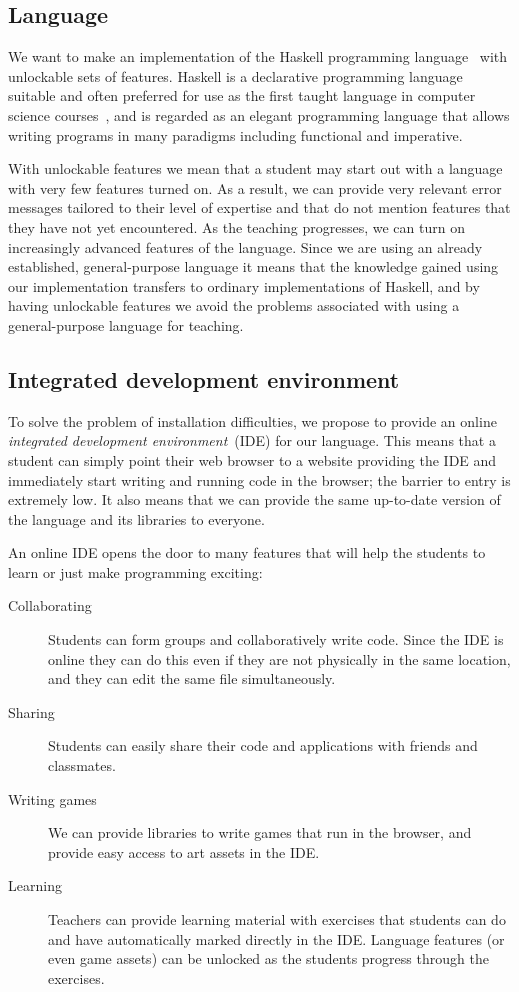 \subsection{Language}

We want to make an implementation of the Haskell programming
language~\cite{marlow2010haskell} with unlockable sets of features.  Haskell is
a declarative programming language suitable and often preferred for use as the
first taught language in computer science courses~\cite{dijkstra2001members},
and is regarded as an elegant programming language that allows writing programs
in many paradigms including functional and imperative.

With unlockable features we mean that a student may start out with a language
with very few features turned on. As a result, we can provide very relevant
error messages tailored to their level of expertise and that do not mention
features that they have not yet encountered. As the teaching progresses, we can
turn on increasingly advanced features of the language.  Since we are using an
already established, general-purpose language it means that the knowledge
gained using our implementation transfers to ordinary implementations of
Haskell, and by having unlockable features we avoid the problems associated
with using a general-purpose language for teaching.

\subsection{Integrated development environment}

To solve the problem of installation difficulties, we propose to provide an
online \emph{integrated development environment}~(IDE) for our language.  This
means that a student can simply point their web browser to a website providing
the IDE and immediately start writing and running code in the browser; the
barrier to entry is extremely low. It also means that we can provide the same
up-to-date version of the language and its libraries to everyone.

An online IDE opens the door to many features that will help the students to
learn or just make programming exciting:
\begin{description}
  \item[Collaborating] Students can form groups and collaboratively write code. Since the IDE
    is online they can do this even if they are not physically in the same location,
    and they can edit the same file simultaneously.
  \item[Sharing] Students can easily share their code and applications with friends and
    classmates.
  \item[Writing games] We can provide libraries to write games that run in the
    browser, and provide easy access to art assets in the IDE.
  \item[Learning]
    Teachers can provide learning material with exercises that students can do
    and have automatically marked directly in the IDE. Language features (or even
    game assets) can be unlocked as the students progress through the
    exercises.
\end{description}

